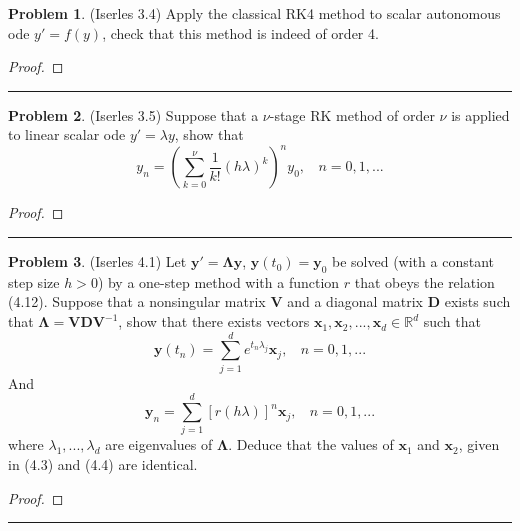 \documentclass[a4paper, 10pt]{article}
\theoremstyle{definition}
\newtheorem{problem}{Problem}
\theoremstyle{hSol}
\begin{document}
\begin{problem} (Iserles 3.4) Apply the classical RK4 method to scalar autonomous ode $y'=f(y)$, check that this method is indeed of order 4.
\end{problem}
\begin{proof} 
\end{proof} 
\noindent\rule{16cm}{0.4pt}

\begin{problem} (Iserles 3.5) Suppose that a $\nu$-stage RK method of order $\nu$ is applied to linear scalar ode $y' = \lambda y$, show that
$$
y_n = \left(\sum_{k=0}^{\nu} \frac{1}{k!} (h \lambda)^k\right)^n y_0,~~~~n=0,1,...
$$
\end{problem}
\begin{proof} 
\end{proof} 
\noindent\rule{16cm}{0.4pt}

\begin{problem} (Iserles 4.1) Let $\bm{y}'= \bm{\Lambda} \bm{y}$, $\bm{y}(t_0)=\bm{y}_0$ be solved (with a constant step size $h>0$) by a one-step method with a function $r$ that obeys the relation (4.12). Suppose that a nonsingular matrix $\bm{V}$ and a diagonal matrix $\bm{D}$ exists such that $\bm{\Lambda} = \bm{V} \bm{D} \bm{V}^{-1}$, show that there exists vectors $\bm{x}_1, \bm{x}_2, ..., \bm{x}_d \in \mathbb{R}^d$ such that
$$
\bm{y}(t_n) = \sum_{j=1}^d e^{t_n \lambda_j} \bm{x}_j,~~~~n=0,1,...
$$
And 
$$
\bm{y}_n = \sum_{j=1}^d [r(h \lambda)]^n \bm{x}_j,~~~~n=0,1,...
$$
where $\lambda_1, ..., \lambda_d$ are eigenvalues of $\bm{\Lambda}$. Deduce that the values of $\bm{x}_1$ and $\bm{x}_2$, given in (4.3) and (4.4) are identical.
\end{problem}
\begin{proof} 
\end{proof} 
\noindent\rule{16cm}{0.4pt}
\end{document}
